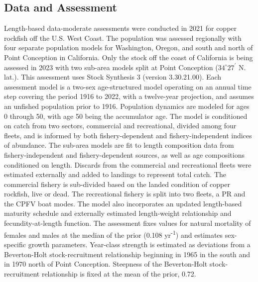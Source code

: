 \documentclass[11pt,
  letterpaper,
]{article}
\begin{document}
\pagebreak

\subsection*{Data and Assessment}\label{data-and-assessment}

Length-based data-moderate assessments were conducted in 2021 for copper rockfish off the U.S. West Coast. The population was assessed regionally with four separate population models for Washington, Oregon, and south and north of Point Conception in California. Only the stock off the coast of California is being assessed in 2023 with two sub-area models split at Point Conception ($34^\circ 27^\prime$ N. lat.). This assessment uses Stock Synthesis 3 (version 3.30.21.00). Each assessment model is a two-sex age-structured model operating on an annual time step covering the period 1916 to 2022, with a twelve-year projection, and assumes an unfished population prior to 1916. Population dynamics are modeled for ages 0 through 50, with age 50 being the accumulator age. The model is conditioned on catch from two sectors, commercial and recreational, divided among four fleets, and is informed by both fishery-dependent and fishery-independent indices of abundance. The sub-area models are fit to length composition data from fishery-independent and fishery-dependent sources, as well as age compositions conditioned on length. Discards from the commercial and recreational fleets were estimated externally and added to landings to represent total catch. The commercial fishery is sub-divided based on the landed condition of copper rockfish, live or dead. The recreational fishery is split into two fleets, a PR and the CPFV boat modes. The model also incorporates an updated length-based maturity schedule and externally estimated length-weight relationship and fecundity-at-length function. The assessment fixes values for natural mortality of females and males at the median of the prior (0.108 yr\textsuperscript{-1}) and estimates sex-specific growth parameters. Year-class strength is estimated as deviations from a Beverton-Holt stock-recruitment relationship beginning in 1965 in the south and in 1970 north of Point Conception. Steepness of the Beverton-Holt stock-recruitment relationship is fixed at the mean of the prior, 0.72.
\end{document}
